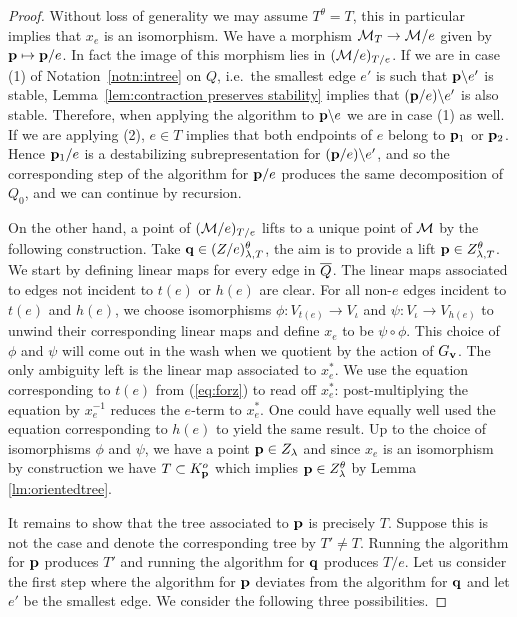\documentclass{amsart}
\theoremstyle{definition}
\begin{document}
\begin{proof}
Without loss of generality we may assume $T^\theta=T$, this in particular implies that $x_e$ is an isomorphism.
We have a morphism $\mathcal{M}_T \rightarrow \mathcal{M}/e$ given by $\mathbf{p} \mapsto \mathbf{p}/e$. 
In fact the image of this morphism lies in $(\mathcal{M}/e)_{T/e}$. If we are in case (1) of Notation~\ref{notn:intree} on $Q$, i.e.\ the smallest edge $e'$ is such that $\mathbf{p}\backslash e'$ is stable, Lemma~\ref{lem:contraction preserves stability} implies that $(\mathbf{p}/e)\backslash e'$ is also stable. Therefore, when applying the algorithm to $\mathbf{p}\backslash e$ we are in case (1) as well. If we are applying (2), $e\in T$ implies that both endpoints of $e$ belong to $\mathbf{p}_1$ or $\mathbf{p}_2$. Hence $\mathbf{p}_1/e$ is a destabilizing subrepresentation for $(\mathbf{p}/e)\backslash e'$, and so the corresponding step of the algorithm for $\mathbf{p}/e$ produces the same decomposition of $Q_0$, and we can continue by recursion. 

On the other hand, a point of $(\mathcal{M}/e)_{T/e}$ lifts to a unique point of $\mathcal{M}$ by the following construction. Take $\mathbf{q} \in (Z/e)_{\lambda,T}^\theta$, the aim is to provide a lift $\mathbf{p} \in Z_{\lambda,T}^\theta$.
We start by defining linear maps for every edge in ${\overline{Q}}$.
The linear maps associated to edges not incident to $t(e)$ or $h(e)$ are clear.
For all non-$e$ edges incident to $t(e)$ and $h(e)$, we choose isomorphisms $\phi \colon V_{t(e)} \rightarrow V_\iota$ and $\psi \colon V_\iota \rightarrow V_{h(e)}$ to unwind their corresponding linear maps and define $x_e$ to be $\psi \circ \phi$.
This choice of $\phi$ and $\psi$ will come out in the wash when we quotient by the action of $G_{\mathbf{v}}$.
The only ambiguity left is the linear map associated to $x_e^*$.
We use the equation corresponding to $t(e)$ from (\ref{eq:forz}) to read off $x_e^*$: post-multiplying the equation by $x_e^{-1}$ reduces the $e$-term to $x_e^*$.
One could have equally well used the equation corresponding to $h(e)$ to yield the same result.
Up to the choice of isomorphisms $\phi$ and $\psi$, we have a point $\mathbf{p} \in Z_\lambda$ and since $x_e$ is an isomorphism by construction we have $T\subset K_{\mathbf{p}}^o$ which implies $\mathbf{p} \in Z_{\lambda}^\theta$ by Lemma \ref{lm:orientedtree}. 

It remains to show that the tree associated to $\mathbf{p}$ is precisely $T$. Suppose this is not the case and denote the corresponding tree by $T'\neq T$. Running the algorithm for $\mathbf{p}$ produces $T'$ and running the algorithm for $\mathbf{q}$ produces $T/e$. Let us consider the first step where the algorithm for $\mathbf{p}$ deviates from the algorithm for $\mathbf{q}$ and let $e'$ be the smallest edge.
We consider the following three possibilities.


\end{proof}
\end{document}
